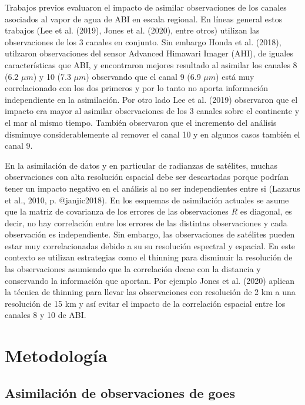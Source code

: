 \documentclass[12pt,oneside,a4paper]{reedthesis}
\begin{document}
Trabajos previos evaluaron el impacto de asimilar observaciones de los canales asociados al vapor de agua de ABI en escala regional. En líneas general estos trabajos (Lee et al. (2019), Jones et al. (2020), entre otros) utilizan las observaciones de los 3 canales en conjunto. Sin embargo Honda et al. (2018), utilzaron observaciones del sensor Advanced Himawari Imager (AHI), de iguales características que ABI, y encontraron mejores resultado al asimilar los canales 8 (6.2 \(\mu m\)) y 10 (7.3 \(\mu m\)) observando que el canal 9 (6.9 \(\mu m\)) está muy correlacionado con los dos primeros y por lo tanto no aporta información independiente en la asimilación. Por otro lado Lee et al. (2019) observaron que el impacto era mayor al asimilar observaciones de los 3 canales sobre el continente y el mar al mismo tiempo. También observaron que el incremento del análisis disminuye considerablemente al remover el canal 10 y en algunos casos también el canal 9.

En la asimilación de datos y en particular de radianzas de satélites, muchas observaciones con alta resolución espacial debe ser descartadas porque podrían tener un impacto negativo en el análisis al no ser independientes entre si (Lazarus et al., 2010, p. @janjic2018). En los esquemas de asimilación actuales se asume que la matriz de covarianza de los errores de las observaciones \(R\) es diagonal, es decir, no hay correlación entre los errores de las distintas observaciones y cada observación es independiente. Sin embargo, las observaciones de satélites pueden estar muy correlacionadas debido a su su resolución espectral y espacial. En este contexto se utilizan estrategias como el thinning para disminuir la resolución de las observaciones asumiendo que la correlación decae con la distancia y conservando la información que aportan. Por ejemplo Jones et al. (2020) aplican la técnica de thinning para llevar las observaciones con resolución de 2 km a una resolución de 15 km y así evitar el impacto de la correlación espacial entre los canales 8 y 10 de ABI.

\hypertarget{metodologuxeda-2}{%
\section{Metodología}\label{metodologuxeda-2}}

\hypertarget{asim-abi}{%
\subsection{Asimilación de observaciones de goes}\label{asim-abi}}
\end{document}
